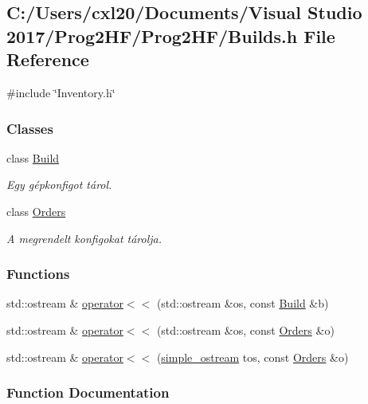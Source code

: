 \subsection{C\+:/\+Users/cxl20/\+Documents/\+Visual Studio 2017/\+Prog2\+H\+F/\+Prog2\+H\+F/\+Builds.h File Reference}
\label{_builds_8h}
{\ttfamily \#include \char`\"{}Inventory.\+h\char`\"{}}\newline
\subsubsection*{Classes}
\begin{DoxyCompactItemize}
\item 
class \mbox{\hyperlink{class_build}{Build}}
\begin{DoxyCompactList}\small\item\em Egy gépkonfigot tárol. \end{DoxyCompactList}\item 
class \mbox{\hyperlink{class_orders}{Orders}}
\begin{DoxyCompactList}\small\item\em A megrendelt konfigokat tárolja. \end{DoxyCompactList}\end{DoxyCompactItemize}
\subsubsection*{Functions}
\begin{DoxyCompactItemize}
\item 
std\+::ostream \& \mbox{\hyperlink{_builds_8h_a8dc72915bcebaea777be339661524cb9}{operator$<$$<$}} (std\+::ostream \&os, const \mbox{\hyperlink{class_build}{Build}} \&b)
\item 
std\+::ostream \& \mbox{\hyperlink{_builds_8h_a5fb6be27fb40218ba8338cb8727178cd}{operator$<$$<$}} (std\+::ostream \&os, const \mbox{\hyperlink{class_orders}{Orders}} \&o)
\item 
std\+::ostream \& \mbox{\hyperlink{_builds_8h_a6125e4e6c603847e74d5f5ccb05da74e}{operator$<$$<$}} (\mbox{\hyperlink{structsimple__ostream}{simple\+\_\+ostream}} tos, const \mbox{\hyperlink{class_orders}{Orders}} \&o)
\end{DoxyCompactItemize}


\subsubsection{Function Documentation}
\mbox{\label{_builds_8h_a8dc72915bcebaea777be339661524cb9}} 
